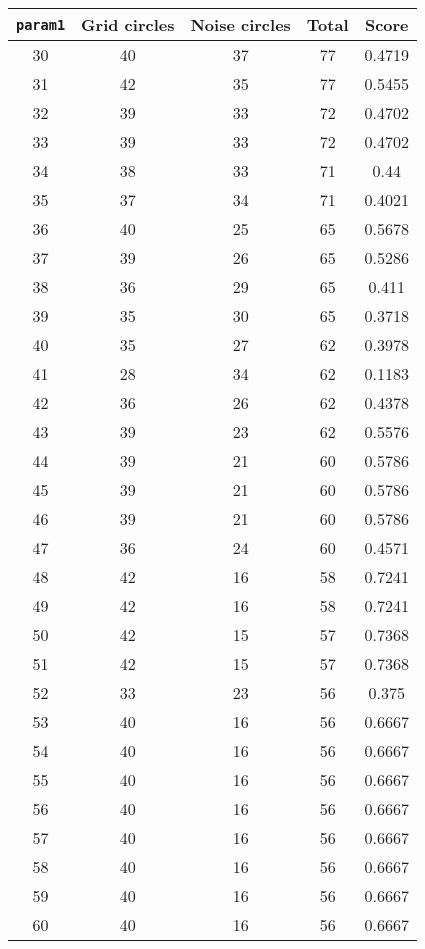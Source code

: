 \documentclass[letterpaper, 12pt]{article}
\begin{document}
\begin{longtable}{|c|c|c|c|c|}
\hline
\textbf{\texttt{param1}} & \textbf{Grid circles} & \textbf{Noise circles} & \textbf{Total} & \textbf{Score} \\
\hline
30 & 40 & 37 & 77 & 0.4719 \\
\hline
31 & 42 & 35 & 77 & 0.5455 \\
\hline
32 & 39 & 33 & 72 & 0.4702 \\
\hline
33 & 39 & 33 & 72 & 0.4702 \\
\hline
34 & 38 & 33 & 71 & 0.44 \\
\hline
35 & 37 & 34 & 71 & 0.4021 \\
\hline
36 & 40 & 25 & 65 & 0.5678 \\
\hline
37 & 39 & 26 & 65 & 0.5286 \\
\hline
38 & 36 & 29 & 65 & 0.411 \\
\hline
39 & 35 & 30 & 65 & 0.3718 \\
\hline
40 & 35 & 27 & 62 & 0.3978 \\
\hline
41 & 28 & 34 & 62 & 0.1183 \\
\hline
42 & 36 & 26 & 62 & 0.4378 \\
\hline
43 & 39 & 23 & 62 & 0.5576 \\
\hline
44 & 39 & 21 & 60 & 0.5786 \\
\hline
45 & 39 & 21 & 60 & 0.5786 \\
\hline
46 & 39 & 21 & 60 & 0.5786 \\
\hline
47 & 36 & 24 & 60 & 0.4571 \\
\hline
48 & 42 & 16 & 58 & 0.7241 \\
\hline
49 & 42 & 16 & 58 & 0.7241 \\
\hline
50 & 42 & 15 & 57 & 0.7368 \\
\hline
51 & 42 & 15 & 57 & 0.7368 \\
\hline
52 & 33 & 23 & 56 & 0.375 \\
\hline
53 & 40 & 16 & 56 & 0.6667 \\
\hline
54 & 40 & 16 & 56 & 0.6667 \\
\hline
55 & 40 & 16 & 56 & 0.6667 \\
\hline
56 & 40 & 16 & 56 & 0.6667 \\
\hline
57 & 40 & 16 & 56 & 0.6667 \\
\hline
58 & 40 & 16 & 56 & 0.6667 \\
\hline
59 & 40 & 16 & 56 & 0.6667 \\
\hline
60 & 40 & 16 & 56 & 0.6667 \\

\end{longtable}
\end{document}

